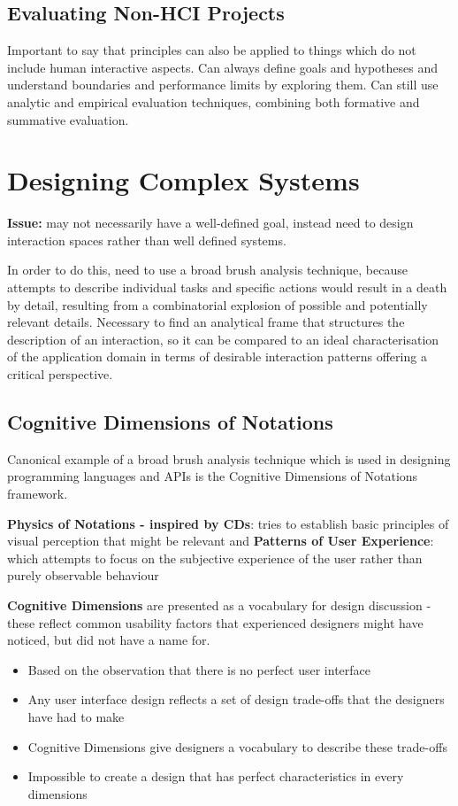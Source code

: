 \documentclass{article}
\newenvironment{cons}{\par\color{red}}{\par}
\begin{document}
\subsection{Evaluating Non-HCI Projects}
Important to say that principles can also be applied to things which do not include human interactive aspects. Can always define goals and hypotheses and understand boundaries and performance limits by exploring them. Can still use analytic and empirical evaluation techniques, combining both formative and summative evaluation.

\section{Designing Complex Systems}
\begin{cons}
\textbf{Issue:} may not necessarily have a well-defined goal, instead need to design interaction spaces rather than well defined systems. 
\end{cons}
\bigskip
In order to do this, need to use a broad brush analysis technique, because attempts to describe individual tasks and specific actions would result in a death by detail, resulting from a combinatorial explosion of possible and potentially relevant details. Necessary to find an analytical frame that structures the description of an interaction, so it can be compared to an ideal characterisation of the application domain in terms of desirable interaction patterns offering a critical perspective.

\subsection{Cognitive Dimensions of Notations}
Canonical example of a broad brush analysis technique which is used in designing programming languages and APIs is the Cognitive Dimensions of Notations framework.

\bigskip
\textbf{Physics of Notations - inspired by CDs}: tries to establish basic principles of visual perception that might be relevant and \textbf{Patterns of User Experience}: which attempts to focus on the subjective experience of the user rather than purely observable behaviour

\bigskip
\textbf{Cognitive Dimensions} are presented as a vocabulary for design discussion - these reflect common usability factors that experienced designers might have noticed, but did not have a name for. 
\begin{itemize}
    \item Based on the observation that there is no perfect user interface
    \item Any user interface design reflects a set of design trade-offs that the designers have had to make
    \item Cognitive Dimensions give designers a vocabulary to describe these trade-offs
    \item Impossible to create a design that has perfect characteristics in every dimensions
\end{itemize}
\end{document}
